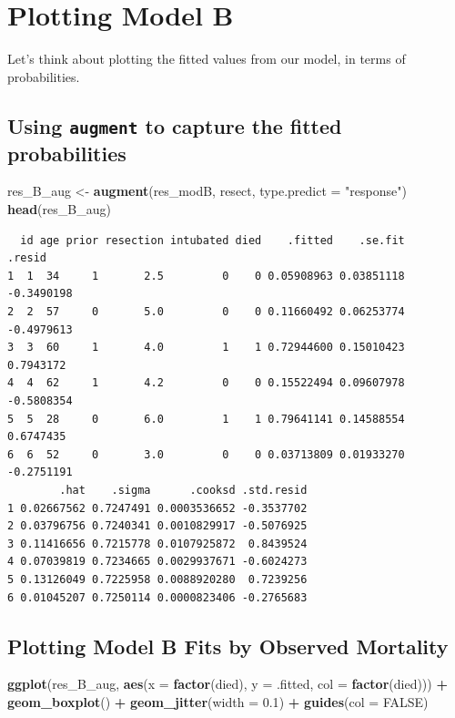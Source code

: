 \documentclass[]{book}
\newenvironment{Shaded}{\begin{snugshade}}{\end{snugshade}}
\newcommand{\KeywordTok}[1]{\textcolor[rgb]{0.13,0.29,0.53}{\textbf{#1}}}
\newcommand{\DataTypeTok}[1]{\textcolor[rgb]{0.13,0.29,0.53}{#1}}
\newcommand{\FloatTok}[1]{\textcolor[rgb]{0.00,0.00,0.81}{#1}}
\newcommand{\StringTok}[1]{\textcolor[rgb]{0.31,0.60,0.02}{#1}}
\newcommand{\OtherTok}[1]{\textcolor[rgb]{0.56,0.35,0.01}{#1}}
\newcommand{\OperatorTok}[1]{\textcolor[rgb]{0.81,0.36,0.00}{\textbf{#1}}}
\newcommand{\NormalTok}[1]{#1}
\theoremstyle{definition}
\theoremstyle{definition}
\theoremstyle{definition}
\theoremstyle{remark}
\begin{document}
\section{Plotting Model B}\label{plotting-model-b}

Let's think about plotting the fitted values from our model, in terms of
probabilities.

\subsection{\texorpdfstring{Using \texttt{augment} to capture the fitted
probabilities}{Using augment to capture the fitted probabilities}}\label{using-augment-to-capture-the-fitted-probabilities-1}

\begin{Shaded}
\begin{Highlighting}[]
\NormalTok{res_B_aug <-}\StringTok{ }\KeywordTok{augment}\NormalTok{(res_modB, resect, }
                     \DataTypeTok{type.predict =} \StringTok{"response"}\NormalTok{)}
\KeywordTok{head}\NormalTok{(res_B_aug)}
\end{Highlighting}
\end{Shaded}

\begin{verbatim}
  id age prior resection intubated died    .fitted    .se.fit     .resid
1  1  34     1       2.5         0    0 0.05908963 0.03851118 -0.3490198
2  2  57     0       5.0         0    0 0.11660492 0.06253774 -0.4979613
3  3  60     1       4.0         1    1 0.72944600 0.15010423  0.7943172
4  4  62     1       4.2         0    0 0.15522494 0.09607978 -0.5808354
5  5  28     0       6.0         1    1 0.79641141 0.14588554  0.6747435
6  6  52     0       3.0         0    0 0.03713809 0.01933270 -0.2751191
        .hat    .sigma      .cooksd .std.resid
1 0.02667562 0.7247491 0.0003536652 -0.3537702
2 0.03796756 0.7240341 0.0010829917 -0.5076925
3 0.11416656 0.7215778 0.0107925872  0.8439524
4 0.07039819 0.7234665 0.0029937671 -0.6024273
5 0.13126049 0.7225958 0.0088920280  0.7239256
6 0.01045207 0.7250114 0.0000823406 -0.2765683
\end{verbatim}

\subsection{Plotting Model B Fits by Observed
Mortality}\label{plotting-model-b-fits-by-observed-mortality}

\begin{Shaded}
\begin{Highlighting}[]
\KeywordTok{ggplot}\NormalTok{(res_B_aug, }\KeywordTok{aes}\NormalTok{(}\DataTypeTok{x =} \KeywordTok{factor}\NormalTok{(died), }\DataTypeTok{y =}\NormalTok{ .fitted, }\DataTypeTok{col =} \KeywordTok{factor}\NormalTok{(died))) }\OperatorTok{+}
\StringTok{    }\KeywordTok{geom_boxplot}\NormalTok{() }\OperatorTok{+}
\StringTok{    }\KeywordTok{geom_jitter}\NormalTok{(}\DataTypeTok{width =} \FloatTok{0.1}\NormalTok{) }\OperatorTok{+}\StringTok{ }
\StringTok{    }\KeywordTok{guides}\NormalTok{(}\DataTypeTok{col =} \OtherTok{FALSE}\NormalTok{)}
\end{Highlighting}
\end{Shaded}
\end{document}
